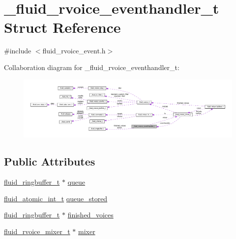 \hypertarget{struct__fluid__rvoice__eventhandler__t}{}\section{\+\_\+fluid\+\_\+rvoice\+\_\+eventhandler\+\_\+t Struct Reference}
\label{struct__fluid__rvoice__eventhandler__t}


{\ttfamily \#include $<$fluid\+\_\+rvoice\+\_\+event.\+h$>$}



Collaboration diagram for \+\_\+fluid\+\_\+rvoice\+\_\+eventhandler\+\_\+t\+:
\nopagebreak
\begin{figure}[H]
\begin{center}
\leavevmode
\includegraphics[width=350pt]{struct__fluid__rvoice__eventhandler__t__coll__graph}
\end{center}
\end{figure}
\subsection*{Public Attributes}
\begin{DoxyCompactItemize}
\item 
\hyperlink{fluid__ringbuffer_8h_acae50537c355202b403188c17c9a9f98}{fluid\+\_\+ringbuffer\+\_\+t} $\ast$ \hyperlink{struct__fluid__rvoice__eventhandler__t_a0ba6a044aaf14287ad847444e841f4de}{queue}
\item 
\hyperlink{fluidsynth__priv_8h_a6b8be882dd9958ea3635a868e1bf5152}{fluid\+\_\+atomic\+\_\+int\+\_\+t} \hyperlink{struct__fluid__rvoice__eventhandler__t_a65dbd6065de0b535ad69696923aaf6ae}{queue\+\_\+stored}
\item 
\hyperlink{fluid__ringbuffer_8h_acae50537c355202b403188c17c9a9f98}{fluid\+\_\+ringbuffer\+\_\+t} $\ast$ \hyperlink{struct__fluid__rvoice__eventhandler__t_a8a2038443e5f835cdb531684b23d1392}{finished\+\_\+voices}
\item 
\hyperlink{fluid__rvoice__mixer_8h_a546bd76f60c5458d73d6c72e3f01d0bf}{fluid\+\_\+rvoice\+\_\+mixer\+\_\+t} $\ast$ \hyperlink{struct__fluid__rvoice__eventhandler__t_a3c8ca9652d789628db1faab90d43b83a}{mixer}
\end{DoxyCompactItemize}


